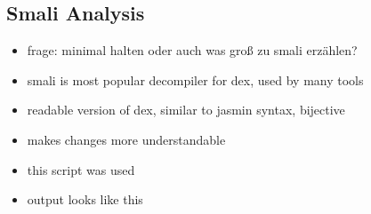 \subsection{Smali Analysis} \label{subsection:tools-baksmali}
\begin{itemize}
  \item frage: minimal halten oder auch was groß zu smali erzählen?
    \item smali is most popular decompiler for dex, used by many tools
    \item readable version of dex, similar to jasmin syntax, bijective
    \item makes changes more understandable
    \item this script was used
    \item output looks like this
\end{itemize}
